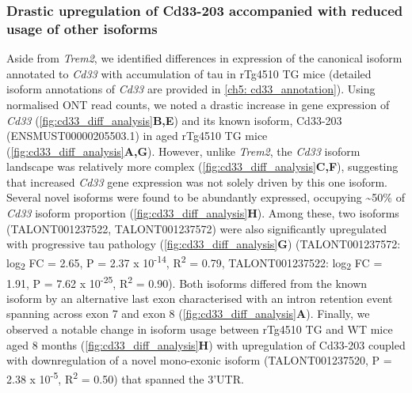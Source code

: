 \subsubsection{Drastic upregulation of Cd33-203 accompanied with reduced usage of other isoforms}
\label{cd33_diff}
Aside from \textit{Trem2}, we identified differences in expression of the canonical isoform annotated to \textit{Cd33} with accumulation of tau in rTg4510 TG mice (detailed isoform annotations of \textit{Cd33} are provided in \cref{ch5: cd33_annotation}). Using normalised ONT read counts, we noted a drastic increase in gene expression of \textit{Cd33} (\cref{fig:cd33_diff_analysis}\textbf{B,E}) and its known isoform, Cd33-203 (ENSMUST00000205503.1) in aged rTg4510 TG mice (\cref{fig:cd33_diff_analysis}\textbf{A,G}). However, unlike \textit{Trem2}, the \textit{Cd33} isoform landscape was relatively more complex (\cref{fig:cd33_diff_analysis}\textbf{C,F}), suggesting that increased \textit{Cd33} gene expression was not solely driven by this one isoform. Several novel isoforms were found to be abundantly expressed, occupying \textasciitilde50\% of \textit{Cd33} isoform proportion (\cref{fig:cd33_diff_analysis}\textbf{H}). Among these, two isoforms (TALONT001237522, TALONT001237572) were also significantly upregulated with progressive tau pathology (\cref{fig:cd33_diff_analysis}\textbf{G}) (TALONT001237572: log\textsubscript{2} FC = 2.65, P = 2.37 x 10\textsuperscript{-14}, R\textsuperscript{2} = 0.79, TALONT001237522: log\textsubscript{2} FC = 1.91, P = 7.62 x 10\textsuperscript{-25}, R\textsuperscript{2} = 0.90). Both isoforms differed from the known isoform by an alternative last exon characterised with an intron retention event spanning across exon 7 and exon 8 (\cref{fig:cd33_diff_analysis}\textbf{A}). Finally, we observed a notable change in isoform usage between rTg4510 TG and WT mice aged 8 months (\cref{fig:cd33_diff_analysis}\textbf{H}) with upregulation of Cd33-203 coupled with downregulation of a novel mono-exonic isoform (TALONT001237520, P = 2.38 x 10\textsuperscript{-5}, R\textsuperscript{2} = 0.50) that spanned the 3'UTR. 

  
